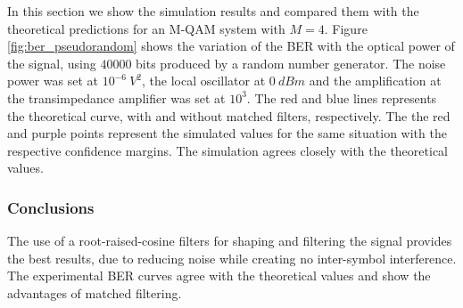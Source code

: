 \begin{refsection}
In this section we show the simulation results and compared them with the theoretical predictions for an M-QAM system with $M=4$. Figure \ref{fig:ber_pseudorandom} shows the variation of the BER with the optical power of the signal, using $40000$ bits produced by a random number generator. The noise power was set at $10^{-6}~V^2$, the local oscillator at $0~dBm$ and the amplification at the transimpedance amplifier was set at $10^3$.
The red and blue lines represents the theoretical curve, with and without matched filters, respectively. The the red and purple points represent the simulated values for the same situation with the respective confidence margins. The simulation agrees closely with the theoretical values.






\subsubsection*{Conclusions}
The use of a root-raised-cosine filters for shaping and filtering the signal provides the best results, due to reducing noise while creating no inter-symbol interference. The experimental BER curves agree with the theoretical values and show the advantages of matched filtering.


\end{refsection}
